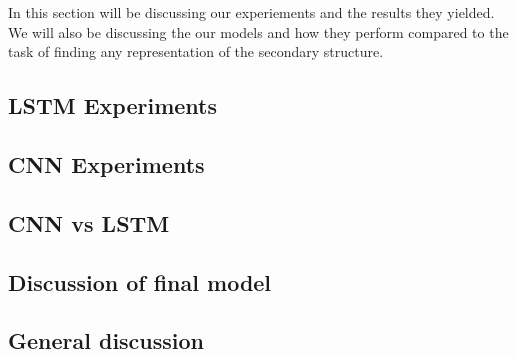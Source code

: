 In this section will be discussing our experiements and the results they yielded. We will also be discussing the our models and how they perform compared to the task of finding any representation of the secondary structure.

\subsection{LSTM Experiments}


\subsection{CNN Experiments}


\subsection{CNN vs LSTM}


\subsection{Discussion of final model}
\subsection{General discussion}
